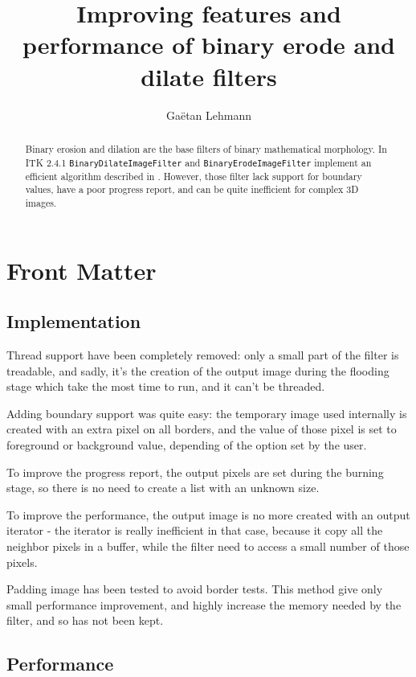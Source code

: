 \documentclass{InsightArticle}
\title{Improving features and performance of binary erode and dilate filters}
\author{Ga\"etan Lehmann}
\begin{document}
\maketitle

\ifhtml
\chapter*{Front Matter\label{front}}
\fi


\begin{abstract}
\noindent
Binary erosion and dilation are the base filters of binary mathematical morphology.
In ITK 2.4.1 \verb$BinaryDilateImageFilter$ and \verb$BinaryErodeImageFilter$ implement
an efficient algorithm described in \cite{Nikopoulos2000}. However, those filter lack
support for boundary values, have a poor progress report, and can be quite inefficient
for complex 3D images.
\end{abstract}


\section{Implementation}

Thread support have been completely removed: only a small part of the filter is treadable,
and sadly, it's the creation of the output image during the flooding stage which take the
most time to run, and it can't be threaded.

Adding boundary support was quite easy: the temporary image used internally is created
with an extra pixel on all borders, and the value of those pixel is set to foreground 
or background value, depending of the option set by the user.

To improve the progress report, the output pixels are set during the burning stage,
so there is no need to create a list with an unknown size.

To improve the performance, the output image is no more created with an output
iterator - the iterator is really inefficient in that case, because it copy all the neighbor pixels
in a buffer, while the filter need to access a small number of those pixels.

Padding image has been tested to avoid border tests. This method give only small
performance improvement, and highly increase the memory needed by the filter, and so
has not been kept.

\section{Performance}
\end{document}
